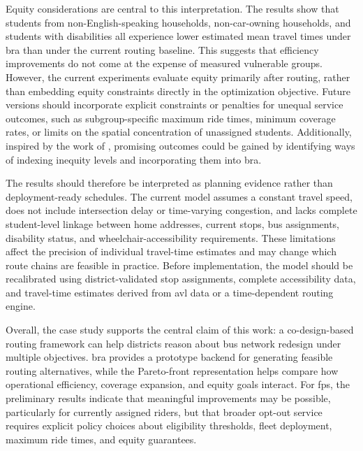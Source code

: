 Equity considerations are central to this interpretation. The results show that students from non-English-speaking households, non-car-owning households, and students with disabilities all experience lower estimated mean travel times under \gls{bra} than under the current routing baseline. This suggests that efficiency improvements do not come at the expense of measured vulnerable groups. However, the current experiments evaluate equity primarily after routing, rather than embedding equity constraints directly in the optimization objective. Future versions should incorporate explicit constraints or penalties for unequal service outcomes, such as subgroup-specific maximum ride times, minimum coverage rates, or limits on the spatial concentration of unassigned students. Additionally, inspired by the work of \textcite{vanweeEvaluatingTransportEquity2021}, promising outcomes could be gained by identifying ways of indexing inequity levels and incorporating them into \gls{bra}.

The results should therefore be interpreted as planning evidence rather than deployment-ready schedules. The current model assumes a constant travel speed, does not include intersection delay or time-varying congestion, and lacks complete student-level linkage between home addresses, current stops, bus assignments, disability status, and wheelchair-accessibility requirements. These limitations affect the precision of individual travel-time estimates and may change which route chains are feasible in practice. Before implementation, the model should be recalibrated using district-validated stop assignments, complete accessibility data, and travel-time estimates derived from \gls{avl} data or a time-dependent routing engine.

Overall, the case study supports the central claim of this work: a co-design-based routing framework can help districts reason about bus network redesign under multiple objectives. \Gls{bra} provides a prototype backend for generating feasible routing alternatives, while the Pareto-front representation helps compare how operational efficiency, coverage expansion, and equity goals interact. For \gls{fps}, the preliminary results indicate that meaningful improvements may be possible, particularly for currently assigned riders, but that broader opt-out service requires explicit policy choices about eligibility thresholds, fleet deployment, maximum ride times, and equity guarantees.

